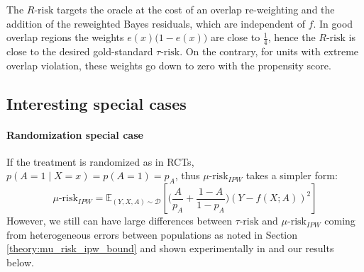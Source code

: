 \documentclass{report}
\begin{document}
The $R \text{-risk}$ targets the oracle at the cost of an overlap re-weighting
and the addition of the reweighted Bayes residuals, which are independent of
$f$. In good overlap regions the weights $e(x) \big(1-e(x) \big)$ are close to
$\frac{1}{4}$, hence the $R \text{-risk}$ is close to the desired gold-standard
$\tau \text{-risk}$. On the contrary, for units with extreme overlap violation,
these weights go down to zero with the propensity score.




\subsection{Interesting special cases}

\paragraph{Randomization special case}\label{remark:rct} If the treatment is
randomized as in RCTs, $p(A=1 \mid X=x) = p(A=1)=p_A$, thus
$\mu\text{-risk}_{IPW}$ takes a simpler form:
\begin{equation*}
  \mu\text{-risk}_{IPW} = \mathbb{E}_{(Y, X, A) \sim \mathcal D}\left[ \Big( \frac{A}{p_A} + \frac{1-A}{1-p_A} \Big) (Y-f(X ; A))^2 \right]
\end{equation*}
However, we still can have large differences
between $\tau\text{-risk}$ and $\mu\text{-risk}_{IPW}$ coming from heterogeneous
errors between populations as noted in Section \ref{theory:mu_risk_ipw_bound}
and shown experimentally in \citet{schuler_comparison_2018} and our
results below.
\end{document}
